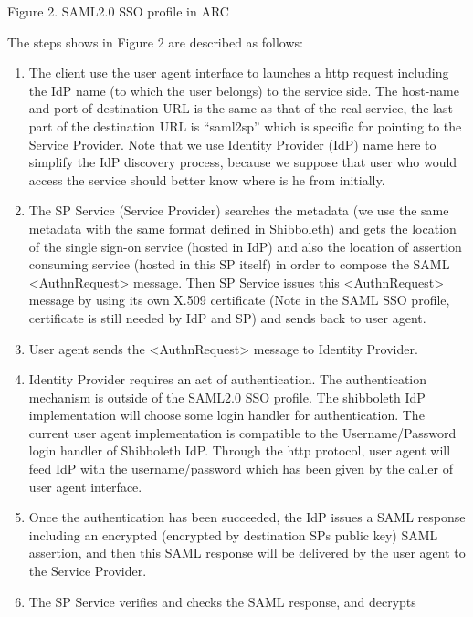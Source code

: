 \documentclass{article}
\newcommand\liststyleLiv{%
\renewcommand\theenumi{\arabic{enumi}}
\renewcommand\theenumii{\arabic{enumii}}
\renewcommand\theenumiii{\arabic{enumiii}}
\renewcommand\theenumiv{\arabic{enumiv}}
\renewcommand\labelenumi{\theenumi.}
\renewcommand\labelenumii{\theenumii.}
\renewcommand\labelenumiii{\theenumiii.}
\renewcommand\labelenumiv{\theenumiv.}
}
\begin{document}
\bigskip


\bigskip

{\centering
Figure 2. SAML2.0 SSO profile in ARC
\par}

The steps shows in Figure 2 are described as follows:

\liststyleLiv
\begin{enumerate}
\item The client use the user agent interface to launches a http request
including the IdP name (to which the user belongs) to the service side.
The host-name and port of destination URL is the same as that of the
real service, the last part of the destination URL is
{\textquotedblleft}saml2sp{\textquotedblright} which is specific for
pointing to the Service Provider. Note that we use Identity Provider
(IdP) name here to simplify the IdP discovery process, because we
suppose that user who would access the service should better know where
is he from initially.
\item The SP Service (Service Provider) searches the metadata (we use
the same metadata with the same format defined in Shibboleth) and gets
the location of the single sign-on service (hosted in IdP) and also the
location of assertion consuming service (hosted in this SP itself) in
order to compose the SAML {\textless}AuthnRequest{\textgreater}
message. Then SP Service issues this
{\textless}AuthnRequest{\textgreater} message by using its own X.509
certificate (Note in the SAML SSO profile, certificate is still needed
by IdP and SP) and sends back to user agent.
\item User agent sends the {\textless}AuthnRequest{\textgreater} message
to Identity Provider.
\item Identity Provider requires an act of authentication. The
authentication mechanism is outside of the SAML2.0 SSO profile. The
shibboleth IdP implementation will choose some login handler for
authentication. The current user agent implementation is compatible to
the Username/Password login handler of Shibboleth IdP. Through the http
protocol, user agent will feed IdP with the username/password which has
been given by the caller of user agent interface.
\item Once the authentication has been succeeded, the IdP issues a SAML
response including an encrypted (encrypted by destination
SP{\textquotesingle}s public key) SAML assertion, and then this SAML
response will be delivered by the user agent to the Service Provider. 
\item The SP Service verifies and checks the SAML response, and decrypts

\end{enumerate}
\end{document}
